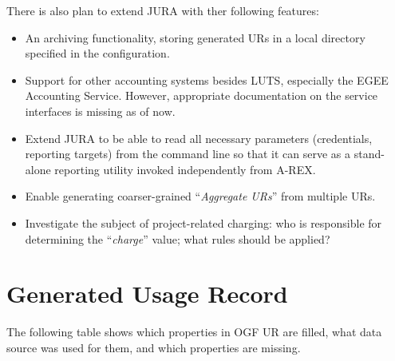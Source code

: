 \documentclass{article}                            %
\begin{document}
There is also plan to extend JURA with ther following features:

\begin{itemize}
\item An archiving functionality, storing generated URs in a local
  directory specified in the configuration.
\item Support for other accounting systems besides LUTS, especially
  the EGEE Accounting Service. However, appropriate documentation on
  the service interfaces is missing as of now.
\item Extend JURA to be able to read all necessary parameters
  (credentials, reporting targets) from the command line so that it
  can serve as a stand-alone reporting utility invoked independently
  from A-REX.
\item Enable generating coarser-grained ``\textit{Aggregate URs}''
  from multiple URs.
\item Investigate the subject of project-related charging: who is
  responsible for determining the ``\textit{charge}'' value; what rules should
  be applied?
\end{itemize}






\newpage
\appendix

\section{Generated Usage Record}
\label{log2ur}
The following table shows which properties in OGF UR\cite{ur} are
filled, what data source was used for them, and which properties are
missing.

\end{document}
